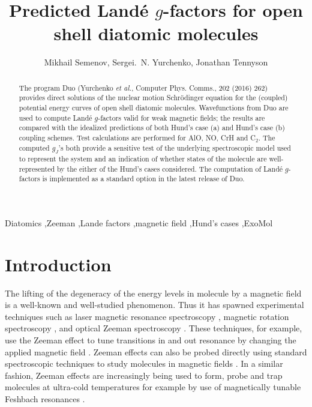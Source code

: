 \documentclass[preprint,review,12pt]{elsarticle}
\newcommand{\2}{$_{2}$}
\newcommand{\3}{$_{3}$}
\newcommand{\4}{$_{4}$}
\newcommand{\8}{$^{18}$}
\newcommand{\6}{$^{16}$}
\newcommand{\7}{$^{17}$}
\begin{document}
	
	\begin{frontmatter}
		
		\title{Predicted Land\'e $g$-factors for open shell diatomic molecules}
		\author{Mikhail Semenov, Sergei.~N. Yurchenko, Jonathan Tennyson}
		\address{Department of Physics and Astronomy, University College London,
			London, WC1E 6BT, UK}
		
		\begin{abstract}
The program {\sc Duo} (Yurchenko {\it et al.}, Computer Phys. Comms., 202
(2016) 262) provides direct solutions of the nuclear motion Schr\"odinger
equation for the (coupled) potential energy curves of open shell
diatomic molecules. Wavefunctions from  {\sc Duo} are used to compute
Land\'e $g$-factors valid for weak magnetic fields; the results
are compared with the idealized predictions of both Hund's case (a)
and Hund's case (b) coupling schemes. Test calculations are performed
for AlO, NO, CrH and C$_2$. The computed $g_J$'s both provide a sensitive test
of the underlying spectroscopic model used to represent the
system and an indication of whether states of the molecule are
well-represented by the either of the  Hund's cases considered.
The computation of Land\'e $g$-factors is implemented as a standard
option in the latest release of  {\sc Duo}.			
		\end{abstract}
		
		\begin{keyword}
Diatomics \sep  Zeeman \sep Lande factors \sep magnetic field \sep  Hund's cases \sep ExoMol
			
		\end{keyword}
	\end{frontmatter}
	
	\section{Introduction}
	
The lifting of the degeneracy of the energy levels in molecule by a magnetic field is
a well-known and well-studied phenomenon. Thus it has spawned experimental
techniques such as laser magnetic resonance spectroscopy \cite{81Davies,06GoRoBe.CoH},
magnetic rotation spectroscopy \cite{92MccFie.NiH},
and optical Zeeman spectroscopy \cite{14ZhStxx.MgH,12QiLiSt.TiH}. These techniques,
for example, use the Zeeman effect to tune transitions in and out resonance
by changing the applied magnetic field \cite{07ChBaPe.CrH}.
Zeeman effects can also be probed directly using standard spectroscopic
techniques to study molecules in magnetic fields \cite{09VaAsCr.NiH,12RoCrRi.NiH,14CrDoRi.FeH}.
In a similar
fashion, Zeeman effects are increasingly being used to form, probe and trap
molecules at ultra-cold temperatures  \cite{98WeDeGu.CaH} for example by
use of  magnetically tunable Feshbach resonances \cite{06KoGoJu}.
\end{document}
